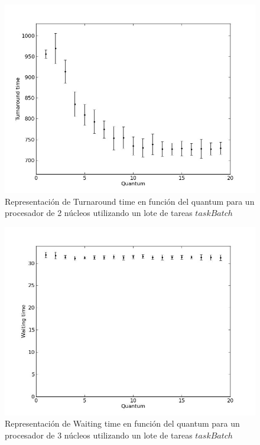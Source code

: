 \begin{figure}[H]
	\begin{center}
		  \includegraphics[scale=0.3]{graficos/cores_2_ta.jpg}
		  \caption{Representación de Turnaround time en función del quantum para un procesador de 2 núcleos utilizando un lote de tareas $taskBatch$}
		  \label{fig:contra1}
	\end{center}
\end{figure}

\begin{figure}[H]
	\begin{center}
		  \includegraphics[scale=0.3]{graficos/cores_3_wt.jpg}
		  \caption{Representación de Waiting time en función del quantum para un procesador de 3 núcleos utilizando un lote de tareas $taskBatch$}
		  \label{fig:contra1}
	\end{center}
\end{figure}

